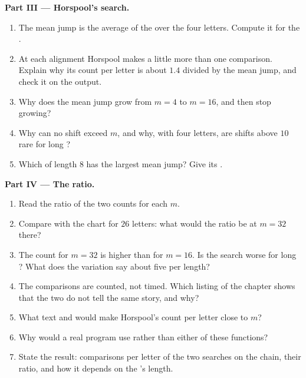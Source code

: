 \begin{problem}
\medskip\noindent\textbf{Part III --- Horspool's search.}
\begin{enumerate}[resume]
  \item The mean jump is the average of the  over the four letters. Compute it for the 
    .
  \item At each alignment Horspool makes a little more than one comparison. Explain why its count per letter is
    about $1.4$ divided by the mean jump, and check it on the output.
  \item Why does the mean jump grow from $m = 4$ to $m = 16$, and then stop growing?
  \item Why can no shift exceed $m$, and why, with four letters, are shifts above $10$ rare for long ?
  \item Which  of length $8$ has the largest mean jump? Give its .
\end{enumerate}

\medskip\noindent\textbf{Part IV --- The ratio.}
\begin{enumerate}[resume]
  \item Read the ratio of the two counts for each $m$.
  \item Compare with the chart for $26$ letters: what would the ratio be at $m = 32$ there?
  \item The count for $m = 32$ is higher than for $m = 16$. Is the search worse for long ? What does the
    variation say about five  per length?
  \item The comparisons are counted, not timed. Which listing of the chapter shows that the two do not tell the same
    story, and why?
  \item What text and  would make Horspool's count per letter close to $m$?
  \item Why would a real program use  rather than either of these functions?
  \item State the result: comparisons per letter of the two searches on the chain, their ratio, and how it depends on
    the 's length.
\end{enumerate}
\end{problem}

